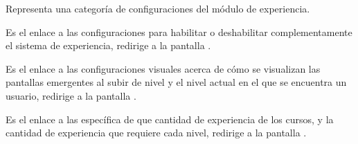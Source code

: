    \begin{description}[font=\color{primary}]

            Representa una categoría de configuraciones del módulo de experiencia. \hfill

        \begin{description}[font={\labelitemi\ \color{black}}]

            Es el enlace a las configuraciones para habilitar o deshabilitar complementamente
            el sistema de experiencia, redirige a la pantalla .

            Es el enlace a las configuraciones visuales acerca de cómo se visualizan las
            pantallas emergentes al subir de nivel y el nivel actual en el que se encuentra
            un usuario, redirige a la pantalla .

            Es el enlace a las específica de que cantidad de experiencia de los cursos, y
            la cantidad de experiencia que requiere cada nivel, redirige a la pantalla
            .
        \end{description}

    \end{description}

